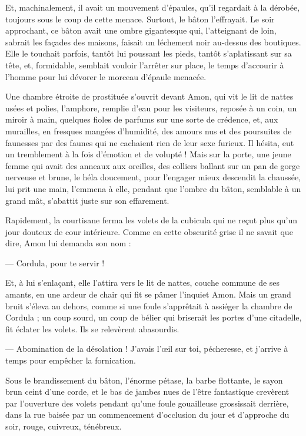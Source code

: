\documentclass[a4paper, 11pt, oneside, polutonikogreek, french]{article}
\begin{document}
Et, machinalement, il avait un mouvement d'épaules, qu'il regardait à la dérobée, toujours sous le coup de cette menace. Surtout, le bâton l'effrayait. Le soir approchant, ce bâton avait une ombre gigantesque qui, l'atteignant de loin, sabrait les façades des maisons, faisait un léchement noir au-dessus des boutiques. Elle le touchait parfois, tantôt lui poussant les pieds, tantôt s'aplatissant sur sa tête, et, formidable, semblait vouloir l'arrêter sur place, le temps d'accourir à l'homme pour lui dévorer le morceau d'épaule menacée.

Une chambre étroite de prostituée s'ouvrit devant Amon, qui vit le lit de nattes usées et polies, l'amphore, remplie d'eau pour les visiteurs, reposée à un coin, un miroir à main, quelques fioles de parfums sur une sorte de crédence, et, aux murailles, en fresques mangées d'humidité, des amours nus et des poursuites de faunesses par des faunes qui ne cachaient rien de leur sexe furieux. Il hésita, eut un tremblement à la fois d'émotion et de volupté ! Mais sur la porte, une jeune femme qui avait des anneaux aux oreilles, des colliers ballant sur un pan de gorge nerveuse et brune, le héla doucement, pour l'engager mieux descendit la chaussée, lui prit une main, l'emmena à elle, pendant que l'ombre du bâton, semblable à un grand mât, s'abattit juste sur son effarement.

Rapidement, la courtisane ferma les volets de la cubicula qui ne reçut plus qu'un jour douteux de cour intérieure. Comme en cette obscurité grise il ne savait que dire, Amon lui demanda son nom :

--- Cordula, pour te servir !

Et, à lui s'enlaçant, elle l'attira vers le lit de nattes, couche commune de ses amants, en une ardeur de chair qui fit se pâmer l'inquiet Amon. Mais un grand bruit s'éleva au dehors, comme si une foule s'apprêtait à assiéger la chambre de Cordula ; un coup sourd, un coup de bélier qui briserait les portes d'une citadelle, fit éclater les volets. Ils se relevèrent abasourdis.

--- Abomination de la désolation ! J'avais l'œil sur toi, pécheresse, et j'arrive à temps pour empêcher la fornication.

Sous le brandissement du bâton, l'énorme pétase, la barbe flottante, le sayon brun ceint d'une corde, et le bas de jambes nues de l'être fantastique crevèrent par l'ouverture des volets pendant qu'une foule gouailleuse grossissait derrière, dans la rue baisée par un commencement d'occlusion du jour et d'approche du soir, rouge, cuivreux, ténébreux.
\end{document}
